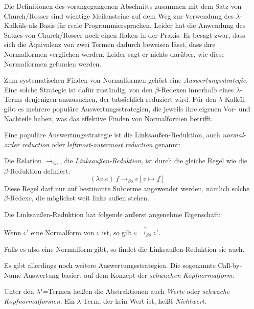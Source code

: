 Die Definitionen des vorangegangenen Abschnitts zusammen mit dem Satz
von Church/\linebreak[0]Rosser sind wichtige Meilensteine auf dem Weg zur
Verwendung des $\lambda$-Kalküls als Basis für reale
Programmiersprachen.  Leider hat die Anwendung des Satzes von
Church/Rosser noch einen Haken in der Praxis: Er besagt zwar, dass sich
die Äquivalenz von zwei Termen dadurch beweisen lässt, dass ihre
Normalformen verglichen werden.  Leider sagt er nichts darüber,
wie diese Normalformen gefunden werden.

Zum systematischen Finden von Normalformen gehört
eine \textit{Auswertungsstrategie}.  Eine
solche Strategie ist dafür zuständig, von den $\beta$-Redexen
innerhalb eines $\lambda$-Terms denjenigen auszusuchen, der
tatsächlich reduziert wird.  Für den $\lambda$-Kalkül gibt es mehrere
populäre Auswertungsstrategien, die jeweils ihre eigenen Vor- und
Nachteile haben, was das effektive Finden von Normalformen betrifft.

Eine populäre Auswertungsstrategie ist die Linksaußen-Reduktion, auch
\textit{normal-order reduction} oder
\textit{leftmost-outermost reduction} genannt:
%
\begin{definition}
  Die Relation $\rightarrow_{\beta o}$, die
  \textit{Linksaußen-Reduktion}, ist durch die gleiche Regel wie
  die $\beta$-Reduktion definiert:
  \begin{displaymath}
    (\lambda v.e)~f \rightarrow_{\beta o} e[v\mapsto f]
  \end{displaymath}
  Diese Regel darf nur auf bestimmte Subterme angewendet werden,
  nämlich solche $\beta$-Redexe, die möglichst weit
  links außen stehen.
\end{definition}
%
Die Linksaußen-Reduktion hat folgende äußerst angenehme Eigenschaft:
%
\begin{satz}
  Wenn $e'$ eine Normalform von $e$ ist, so gilt
  $e\overset{\ast}{\rightarrow_{\beta o}} e'$.
\end{satz}
%
Falls es also eine Normalform gibt, so findet die Linksaußen-Reduktion
sie auch.

Es gibt allerdings noch weitere Auswertungsstrategien.  Die sogenannte
Call-by-Name-Auswertung basiert auf dem Konzept der \textit{schwachen
  Kopfnormalform}:

\begin{definition}\label{def:wert}
  Unter den $\lambda$"=Termen heißen die Abstraktionen auch
  \textit{Werte} oder \textit{schwache Kopfnormalformen}.  Ein
  $\lambda$-Term, der kein Wert ist, heißt \textit{Nichtwert}.  %
\end{definition}

